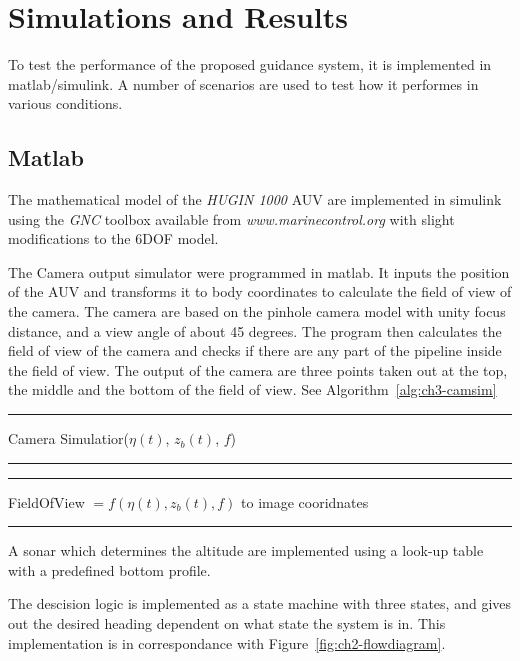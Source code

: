 \chapter{Simulations and Results}
	\label{ch3}
	To test the performance of the proposed guidance system, it is implemented in matlab/simulink. A number of
	scenarios are used to test how it performes in various conditions.
	

\section{Matlab}
	The mathematical model of the \textit{HUGIN 1000} AUV are implemented in simulink using the
	\textit{GNC} toolbox available from \textit{www.marinecontrol.org} with slight modifications to the
	6DOF model.

	The Camera output simulator were programmed in matlab. It inputs the position of the AUV and
	transforms it to body coordinates to calculate the field of view of the camera. The camera are based
	on the pinhole camera model with unity focus distance, and a view angle of about 45 degrees. The
	program then calculates the field of view of the camera and checks if there are any part of the
	pipeline inside the field of view. The output of the camera are three points taken out at the top, the
	middle and the bottom of the field of view. See Algorithm~\ref{alg:ch3-camsim}
	\begin{algorithm}[htbp]
		\hrule
		\caption{Camera Simulatior($\eta(t)$, $z_b(t)$, $f$)}
		\label{alg:ch3-camsim}
		\hrule
		\hrule\vspace{\onelineskip}
		\begin{algorithmic}
			\STATE FieldOfView $= f(\eta(t), z_b(t), f)$
				 to image cooridnates
			\ENDIF
		\end{algorithmic}
		\vspace{\onelineskip}\hrule
		\vspace{0.2pt}
	\end{algorithm}

	A sonar which determines the altitude are implemented using a look-up table with a predefined bottom
	profile.

	The descision logic is implemented as a state machine with three states, and gives out the 
	desired heading dependent on what state the system is in. This implementation is in correspondance
	with  Figure~\ref{fig:ch2-flowdiagram}.


